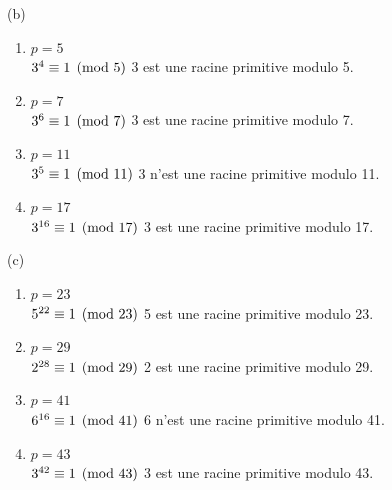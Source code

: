 \begin{solution}
    (b)
    \begin{enumerate}[label=(\roman*)]
        \item $p = 5$ \\
        \(
            3^4 \equiv 1 \pmod{5} \\
        \)
        3 est une racine primitive modulo 5.

        \item $p = 7$ \\
        \(
            3^6 \equiv 1 \pmod{7} \\
        \)
        3 est une racine primitive modulo 7.

        \item $p = 11$ \\
        \(
            3^5 \equiv 1 \pmod{11} \\
        \)
        3 n'est une racine primitive modulo 11.

        \item $p = 17$ \\
        \(
            3^{16} \equiv 1 \pmod{17} \\
        \)
        3 est une racine primitive modulo 17. \\
    \end{enumerate}

    (c)
    \begin{enumerate}[label=(\roman*)]
        \item $p = 23$ \\
        \(
            5^{22} \equiv 1 \pmod{23} \\
        \)
        5 est une racine primitive modulo 23.

        \item $p = 29$ \\
        \(
            2^{28} \equiv 1 \pmod{29} \\
        \)
        2 est une racine primitive modulo 29.

        \item $p = 41$ \\
        \(
            6^{16} \equiv 1 \pmod{41} \\
        \)
        6 n'est une racine primitive modulo 41.
    
        \item $p = 43$ \\
        \(
            3^{42} \equiv 1 \pmod{43} \\
        \)
        3 est une racine primitive modulo 43.
    \end{enumerate}

\end{solution}

